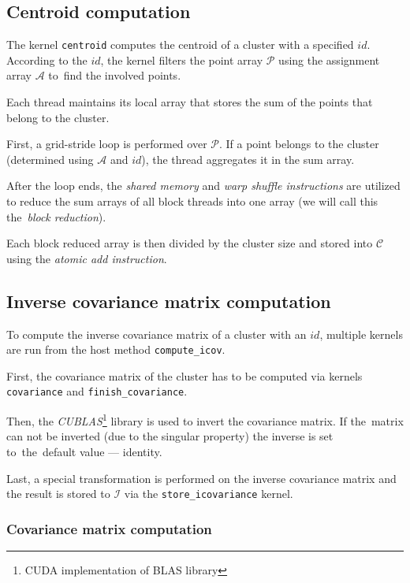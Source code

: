 \subsection{Centroid computation}

The kernel \texttt{centroid} computes the centroid of a cluster with a specified $id$. According to the $id$, the kernel filters the point array $\mathcal{P}$ using the assignment array $\mathcal{A}$ to~find the involved points.

Each thread maintains its local array that stores the sum of the points that belong to the cluster. 

First, a grid-stride loop is performed over $\mathcal{P}$. If a point belongs to the cluster (determined using $\mathcal{A}$ and $id$), the thread aggregates it in the sum array. 

After the loop ends, the \emph{shared memory} and \emph{warp shuffle instructions} are utilized to reduce the sum arrays of all block threads into one array (we will call this the~\emph{block reduction}).

Each block reduced array is then divided by the cluster size and stored into $\mathcal{C}$ using the \emph{atomic add instruction}. 

\subsection{Inverse covariance matrix computation}


To compute the inverse covariance matrix of a cluster with an $id$, multiple kernels are run from the host method \texttt{compute\_icov}. 

First, the covariance matrix of the cluster has to be computed via kernels \texttt{covariance} and \texttt{finish\_covariance}. 

Then, the \emph{CUBLAS}\footnote{CUDA implementation of BLAS library} library is used to invert the covariance matrix. If the~matrix can not be inverted (due to the singular property) the inverse is set to~the~default value --- identity. 

Last, a special transformation is performed on the inverse covariance matrix and the result is stored to $\mathcal{I}$ via the \texttt{store\_icovariance} kernel.

\subsubsection{Covariance matrix computation}

